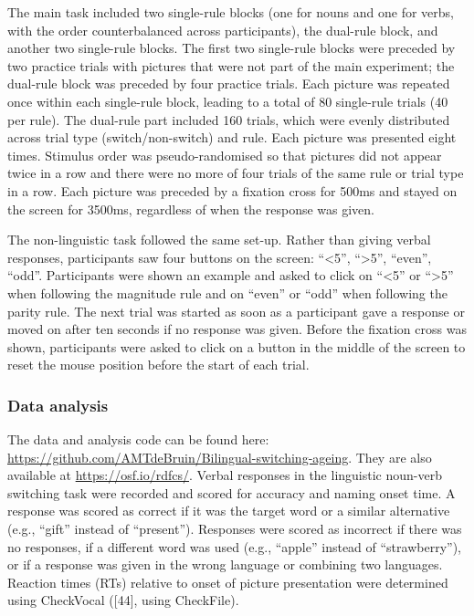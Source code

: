 \documentclass[
]{article}
\begin{document}
The main task included two single-rule blocks (one for nouns and one for verbs, with the order counterbalanced across participants), the dual-rule block, and another two single-rule blocks. The first two single-rule blocks were preceded by two practice trials with pictures that were not part of the main experiment; the dual-rule block was preceded by four practice trials. Each picture was repeated once within each single-rule block, leading to a total of 80 single-rule trials (40 per rule). The dual-rule part included 160 trials, which were evenly distributed across trial type (switch/non-switch) and rule. Each picture was presented eight times. Stimulus order was pseudo-randomised so that pictures did not appear twice in a row and there were no more of four trials of the same rule or trial type in a row. Each picture was preceded by a fixation cross for 500ms and stayed on the screen for 3500ms, regardless of when the response was given.

The non-linguistic task followed the same set-up. Rather than giving verbal responses, participants saw four buttons on the screen: ``\textless5'', ``\textgreater5'', ``even'', ``odd''. Participants were shown an example and asked to click on ``\textless5'' or ``\textgreater5'' when following the magnitude rule and on ``even'' or ``odd'' when following the parity rule. The next trial was started as soon as a participant gave a response or moved on after ten seconds if no response was given. Before the fixation cross was shown, participants were asked to click on a button in the middle of the screen to reset the mouse position before the start of each trial.

\hypertarget{data-analysis}{%
\subsubsection{Data analysis}\label{data-analysis}}

The data and analysis code can be found here: \url{https://github.com/AMTdeBruin/Bilingual-switching-ageing}. They are also available at \url{https://osf.io/rdfcs/}.
Verbal responses in the linguistic noun-verb switching task were recorded and scored for accuracy and naming onset time. A response was scored as correct if it was the target word or a similar alternative (e.g., ``gift'' instead of ``present''). Responses were scored as incorrect if there was no responses, if a different word was used (e.g., ``apple'' instead of ``strawberry''), or if a response was given in the wrong language or combining two languages. Reaction times (RTs) relative to onset of picture presentation were determined using CheckVocal ({[}44{]}, using CheckFile).
\end{document}
